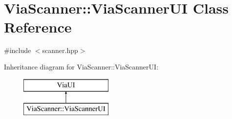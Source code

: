 \hypertarget{class_via_scanner_1_1_via_scanner_u_i}{}\section{Via\+Scanner\+:\+:Via\+Scanner\+UI Class Reference}
\label{class_via_scanner_1_1_via_scanner_u_i}


{\ttfamily \#include $<$scanner.\+hpp$>$}

Inheritance diagram for Via\+Scanner\+:\+:Via\+Scanner\+UI\+:\begin{figure}[H]
\begin{center}
\leavevmode
\includegraphics[height=2.000000cm]{class_via_scanner_1_1_via_scanner_u_i}
\end{center}
\end{figure}
